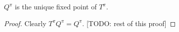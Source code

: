 
\begin{prop}
  $Q^\pi$ is the unique fixed point of $T^\pi$.
\end{prop}

\begin{proof}
  Clearly $T^\pi Q^\pi = Q^\pi$.
  [TODO: rest of this proof]
\end{proof}
